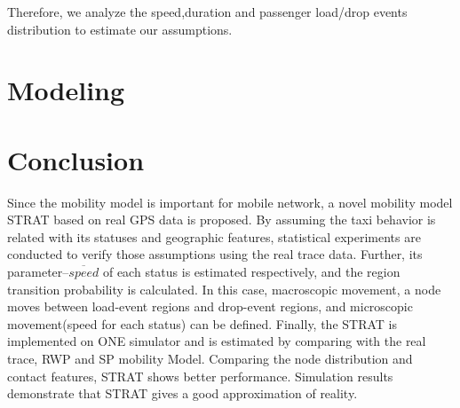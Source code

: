 \documentclass[camera-ready,twocolumn,10pt]{IEEEtran}
\begin{document}
   Therefore, we analyze the speed,duration and passenger load/drop events distribution to estimate our assumptions.








\section{Modeling}
\label{section_modeling}








\section{Conclusion}
\label{section_conclusion}
Since the mobility model is important for mobile network, a novel mobility model STRAT based on real GPS data is proposed. By assuming the taxi behavior is related with its statuses and geographic features, statistical experiments are conducted to verify those assumptions using the real trace data. Further, its parameter--$\overline{speed}$ of each status is estimated respectively, and the region transition probability is calculated. In this case, macroscopic movement, a node moves between load-event regions and drop-event regions, and microscopic movement(speed for each status) can be defined. Finally, the STRAT is implemented on ONE simulator and is estimated by comparing with the real trace, RWP and SP mobility Model.
Comparing the node distribution and contact features, STRAT shows better performance.
Simulation results demonstrate that STRAT gives a good approximation of reality.







\end{document}
